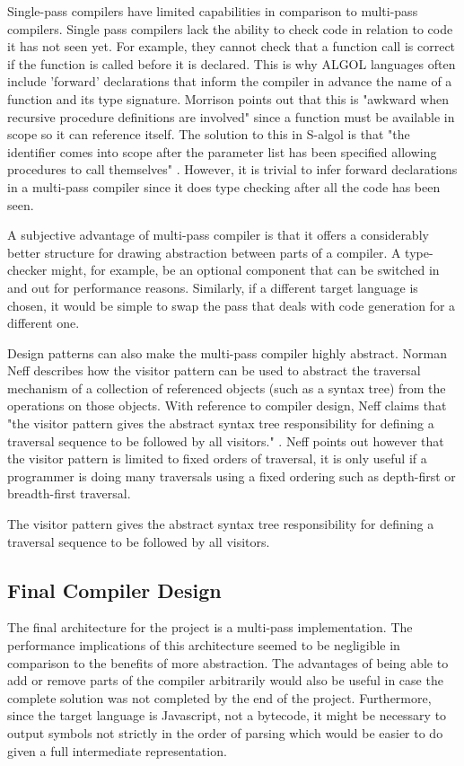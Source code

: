 \documentclass{article}
\begin{document}
Single-pass compilers have limited capabilities in comparison to multi-pass compilers. Single pass compilers lack the ability to check code in relation to code it has not seen yet. For example, they cannot check that a function call is correct if the function is called before it is declared. This is why ALGOL languages often include 'forward' declarations that inform the compiler in advance the name of a function and its type signature. Morrison points out that this is "awkward when recursive procedure definitions are involved" since a function must be available in scope so it can reference itself. The solution to this in S-algol is that "the identifier comes into scope after the parameter list has been specified allowing procedures to call themselves" \cite{morrison1979development}. However, it is trivial to infer forward declarations in a multi-pass compiler since it does type checking after all the code has been seen.

A subjective advantage of multi-pass compiler is that it offers a considerably better structure for drawing abstraction between parts of a compiler. A type-checker might, for example, be an optional component that can be switched in and out for performance reasons. Similarly, if a different target language is chosen, it would be simple to swap the pass that deals with code generation for a different one.

Design patterns can also make the multi-pass compiler highly abstract. Norman Neff describes how the visitor pattern can be used to abstract the traversal mechanism of a collection of referenced objects (such as a syntax tree) from the operations on those objects. With reference to compiler design, Neff claims that "the visitor pattern gives the abstract syntax tree responsibility for defining a traversal sequence to be followed by all visitors." \cite{neff1999oo}. Neff points out however that the visitor pattern is limited to fixed orders of traversal, it is only useful if a programmer is doing many traversals using a fixed ordering such as depth-first or breadth-first traversal. 

The visitor pattern gives the abstract syntax tree responsibility for defining a traversal sequence to be followed by all visitors.

\subsection{Final Compiler Design}

The final architecture for the project is a multi-pass implementation. The performance implications of this architecture seemed to be negligible in comparison to the benefits of more abstraction. The advantages of being able to add or remove parts of the compiler arbitrarily would also be useful in case the complete solution was not completed by the end of the project. Furthermore, since the target language is Javascript, not a bytecode, it might be necessary to output symbols not strictly in the order of parsing which would be easier to do given a full intermediate representation.
\end{document}
